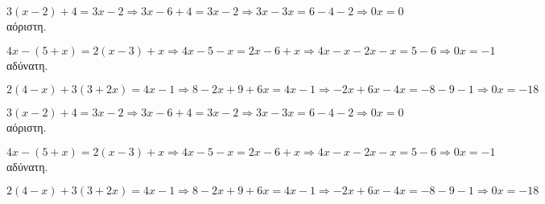 \begin{rlist}
\item $3(x-2)+4=3x-2\Rightarrow 3x-6+4=3x-2\Rightarrow 3x-3x=6-4-2\Rightarrow 0x=0$ αόριστη.
\item $ 4x-(5+x)=2(x-3)+x\Rightarrow 4x-5-x=2x-6+x\Rightarrow 4x-x-2x-x=5-6\Rightarrow 0x=-1 $ αδύνατη.
\item $ 2(4-x)+3(3+2x)=4x-1\Rightarrow 8-2x+9+6x=4x-1\Rightarrow -2x+6x-4x=-8-9-1\Rightarrow 0x=-18 $
\end{rlist}
\begin{rlist}
\item $3(x-2)+4=3x-2\Rightarrow 3x-6+4=3x-2\Rightarrow 3x-3x=6-4-2\Rightarrow 0x=0$ αόριστη.
\item $ 4x-(5+x)=2(x-3)+x\Rightarrow 4x-5-x=2x-6+x\Rightarrow 4x-x-2x-x=5-6\Rightarrow 0x=-1 $ αδύνατη.
\item $ 2(4-x)+3(3+2x)=4x-1\Rightarrow 8-2x+9+6x=4x-1\Rightarrow -2x+6x-4x=-8-9-1\Rightarrow 0x=-18 $
\end{rlist}
